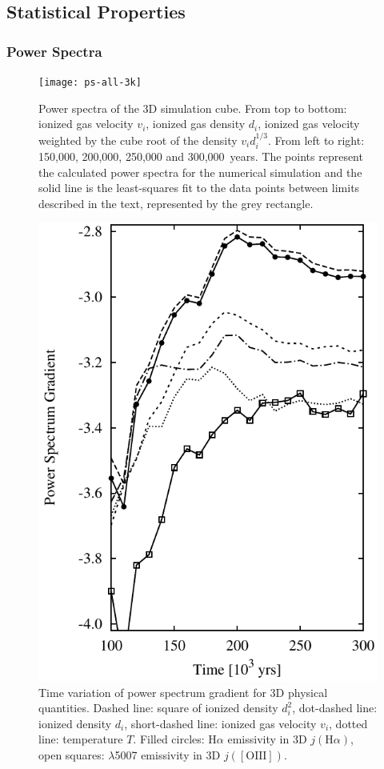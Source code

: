 \documentclass[useAMS,usenatbib]{mn2e}
\begin{document}
\subsection{Statistical Properties}
\label{subsec:statprop}
\subsubsection{Power Spectra}
\label{sssec:pspec}
\begin{figure}
\centering
\texttt{[image: ps-all-3k]}
\caption{Power spectra of the 3D simulation cube. From top to bottom: ionized gas velocity
  $v_i$, ionized gas density $d_i$, ionized gas velocity weighted by the cube root
  of the density $v_i d_i^{1/3}$.  From left to right: 150,000, 200,000, 250,000 and
  300,000~years. The points represent the calculated power spectra for
  the numerical simulation  and the solid line is the least-squares fit to
the data points between limits described in the
text, represented by the grey rectangle.}
\label{fig:ps}
\end{figure}
\begin{figure}
\centering
\includegraphics[width=\linewidth]{psevol}
\caption{Time variation of power spectrum gradient for 3D physical
  quantities. Dashed line: square of ionized density $d_i^2$,
  dot-dashed line: ionized density $d_i$, short-dashed line: ionized
  gas velocity $v_i$, dotted line: temperature $T$. Filled circles:
  H$\alpha$ emissivity in 3D $j(\mathrm{H}\alpha)$, open squares:
  \oiii$\lambda$5007 emissivity in 3D $j(\mathrm{[OIII]})$.}
\label{fig:psevol}
\end{figure}
\end{document}
